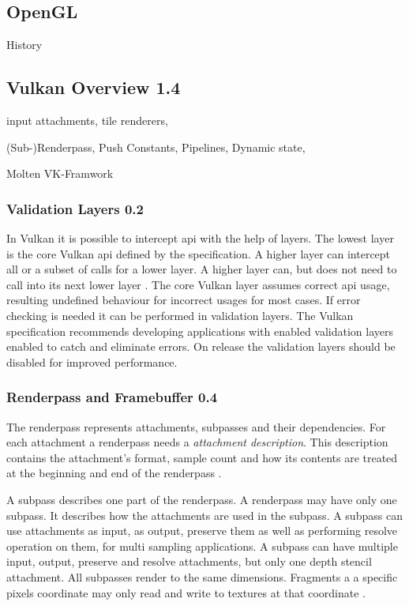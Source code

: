 \subsection{OpenGL}
History


\subsection{Vulkan Overview 1.4}

input attachments, tile renderers,

(Sub-)Renderpass, Push Constants, Pipelines, Dynamic state,

Molten VK-Framwork

\subsubsection{Validation Layers 0.2}

In Vulkan it is possible to intercept \gls{api} with the help of layers. The lowest layer is the core Vulkan \gls{api} defined by the specification. A higher layer can intercept all or a subset of calls for a lower layer. A higher layer can, but does not need to call into its next lower layer \cite{khronos:vulkan:spec1.1}.
The core Vulkan layer assumes correct \gls{api} usage, resulting undefined behaviour for incorrect usages for most cases. If error checking is needed it can be performed in validation layers. The Vulkan specification recommends developing applications with enabled validation layers enabled to catch and eliminate errors. On release the validation layers should be disabled for improved performance.

\subsubsection{Renderpass and Framebuffer 0.4}

The renderpass represents attachments, subpasses and their dependencies. For each attachment a renderpass needs a \textit{attachment description}. This description contains the attachment's format, sample count and how its contents are treated at the beginning and end of the renderpass \cite{khronos:vulkan:spec1.1}.

A subpass describes  one part of the renderpass. A renderpass may have only one subpass. It describes how the attachments are used in the subpass. A subpass can use attachments as input, as output, preserve them as well as performing resolve operation on them, for multi sampling applications. A subpass can have multiple input, output, preserve and resolve attachments, but only one depth stencil attachment. All subpasses render to the same dimensions. Fragments a a specific pixels coordinate may only read and write to textures at that coordinate \cite{khronos:vulkan:spec1.1}.

